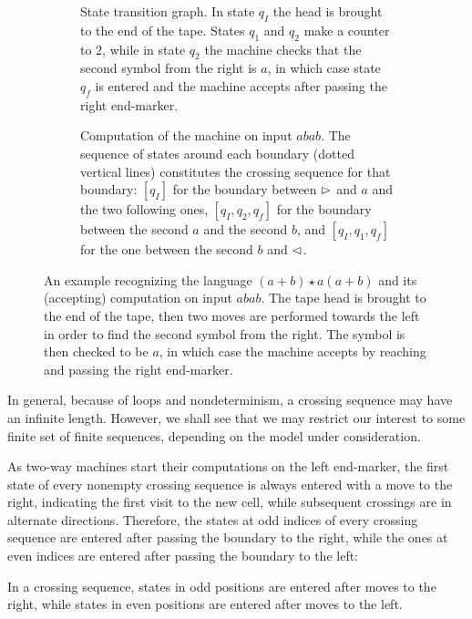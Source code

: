 \begin{figure}
	\centering
	\begin{subfigure}[b]{0.49\textwidth}
		\centering
		
		\caption{State transition graph.
			In state $q_I$ the head is brought to the end of the tape. States $q_1$ and $q_2$ make a counter to $2$, while in state $q_2$ the machine checks that the second symbol from the right is $a$, in which case state $q_f$ is entered and the machine accepts after passing the right end-marker.\newline}
	\end{subfigure}
	\hfill
	\begin{subfigure}[b]{0.49\textwidth}
		\centering
		
		\caption{Computation of the machine on input $abab$.
			The sequence of states around each boundary (dotted vertical lines) constitutes the crossing sequence for that boundary: $[q_I]$ for the boundary between $\rhd$ and $a$ and the two following ones, $[q_I,q_2,q_f]$ for the boundary between the second $a$ and the second $b$, and $[q_I,q_1,q_f]$ for the one between the second $b$ and $\lhd$.}
		\label{sfig:example-crosseq-2}
	\end{subfigure}

	\caption[Example \TDFA and the crossing sequences generated by its computation on a given input.]{An example \TDFA recognizing the language $(a+b)\star a(a+b)$ and its (accepting) computation on input $abab$.
		The tape head is brought to the end of the tape, then two moves are performed towards the left in order to find the second symbol from the right. The symbol is then checked to be $a$, in which case the machine accepts by reaching and passing the right end-marker.}
	\label{fig:example-crosseq}
\end{figure}

In general, because of loops and nondeterminism, a crossing sequence may have an infinite length.
However, we shall see that we may restrict our interest to some finite set of finite sequences, depending on the model under consideration.

As two-way machines start their computations on the left end-marker, the first state of every nonempty crossing sequence is always entered with a move to the right, indicating the first visit to the new cell, while subsequent crossings are in alternate directions.
Therefore, the states at odd indices of every crossing sequence are entered after passing the boundary to the right, while the ones at even indices are entered after passing the boundary to the left:
\begin{fact}\label{fact:crossing-parity}
	In a crossing sequence, states in odd positions are entered after moves to the right, while states in even positions are entered after moves to the left.
\end{fact}

